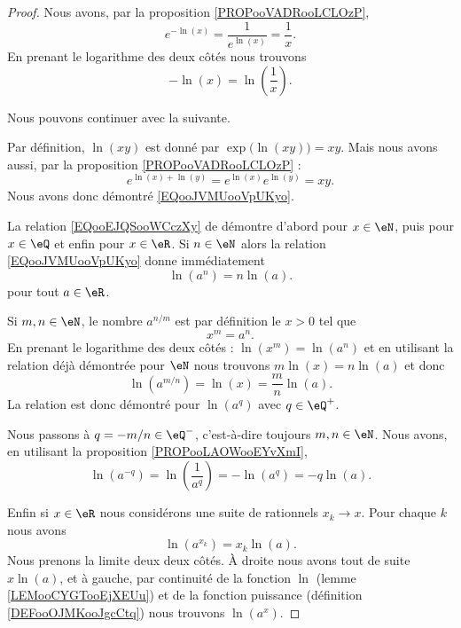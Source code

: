 \begin{proof}
	Nous avons, par la proposition \ref{PROPooVADRooLCLOzP},
	\begin{equation}
		e^{-\ln(x)}=\frac{1}{  e^{\ln(x)} }=\frac{1}{ x }.
	\end{equation}
	En prenant le logarithme des deux côtés nous trouvons
	\begin{equation}
		-\ln(x)=\ln\left( \frac{1}{ x } \right).
	\end{equation}

	Nous pouvons continuer avec la suivante.

	Par définition, \( \ln(xy)\) est donné par \( \exp\big( \ln(xy) \big)=xy\). Mais nous avons aussi, par la proposition \ref{PROPooVADRooLCLOzP} :
	\begin{equation}
		e^{\ln(x)+\ln(y)}=e^{\ln(x)}e^{\ln(y)}=xy.
	\end{equation}
	Nous avons donc démontré \eqref{EQooJVMUooVpUKyo}.

	La relation \eqref{EQooEJQSooWCczXy} de démontre d'abord pour \( x\in \eN\), puis pour \( x\in \eQ\) et enfin pour \( x\in\eR\). Si \( n\in \eN\) alors la relation \eqref{EQooJVMUooVpUKyo} donne immédiatement
	\begin{equation}
		\ln(a^n)=n\ln(a).
	\end{equation}
	pour tout \( a\in \eR\).

	Si \( m,n\in \eN\), le nombre \( a^{n/m}\) est par définition le \( x>0\) tel que
	\begin{equation}
		x^m=a^n.
	\end{equation}
	En prenant le logarithme des deux côtés : \( \ln(x^m)=\ln(a^n)\) et en utilisant la relation déjà démontrée pour \( \eN\) nous trouvons \( m\ln(x)=n\ln(a)\) et donc
	\begin{equation}
		\ln(a^{m/n})=\ln(x)=\frac{ m }{ n }\ln(a).
	\end{equation}
	La relation est donc démontré pour \( \ln(a^q)\) avec \( q\in \eQ^+\).

	Nous passons à \( q=-m/n\in \eQ^-\), c'est-à-dire toujours \( m,n\in \eN\). Nous avons, en utilisant la proposition \ref{PROPooLAOWooEYvXmI},
	\begin{equation}
		\ln(a^{-q})=\ln(\frac{1}{ a^q })=-\ln(a^q)=-q\ln(a).
	\end{equation}

	Enfin si \( x\in \eR\) nous considérons une suite de rationnels \( x_k\to x\). Pour chaque \( k\) nous avons
	\begin{equation}
		\ln(a^{x_k})=x_k\ln(a).
	\end{equation}
	Nous prenons la limite deux deux côtés. À droite nous avons tout de suite \( x\ln(a)\), et à gauche, par continuité de la fonction \( \ln\) (lemme \ref{LEMooCYGTooEjXEUu}) et de la fonction puissance (définition \ref{DEFooOJMKooJgcCtq}) nous trouvons \( \ln(a^x)\).
\end{proof}

